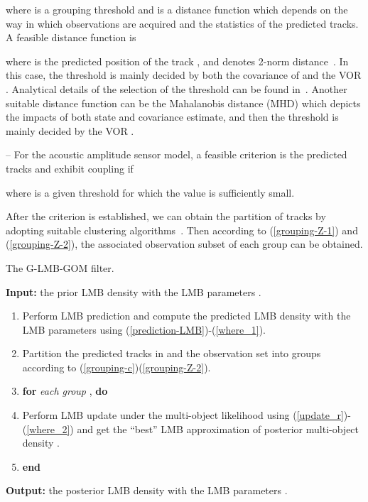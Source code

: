 \documentclass[journal]{IEEEtran}
\begin{document}
{where   is a grouping threshold and  is a distance function which depends on the way in which observations are acquired and the statistics of the predicted tracks.  A feasible  distance function is  

where  is the  predicted position of the track , and  denotes 2-norm distance~\cite{refr:tbd-2,refr:tbd-3, refr:tbd-4}. 
In this case, the threshold  is mainly decided by both the covariance of    and the VOR . Analytical details of the selection of the threshold can be found in~\cite{refr:tbd-3}. 
Another suitable distance function can be the Mahalanobis distance (MHD) which depicts the impacts of both state and covariance estimate, and then the threshold is mainly  decided by the VOR .
 
-- For the acoustic amplitude sensor model, a feasible    criterion is   the predicted tracks  and  exhibit coupling if

 where   is a given threshold for which the value  is sufficiently small. 


After the criterion is established, we can obtain the partition of tracks by adopting suitable clustering algorithms~\cite{refr:clustering_method}. 
Then according to (\ref{grouping-Z-1}) and (\ref{grouping-Z-2}), the associated observation subset of each group can be obtained.







\begin{algorithm}[t]\label{algorithm: generate lgmb}
\caption{The G-LMB-GOM filter.}
\begin{minipage}{0.93\columnwidth}
{\small
\textbf{Input: } the prior LMB density with the LMB parameters .  
\begin{enumerate} []
\item  
Perform LMB prediction  and
 compute the predicted LMB density 
with the LMB parameters 
  using (\ref{prediction-LMB})-(\ref{where_1}).
\item 
Partition the predicted tracks in  and the observation set  into  groups   according to (\ref{grouping-c})(\ref{grouping-Z-2}).
\item \textbf{for }\textit{each group} ,  \textbf{do}

\item Perform LMB update under the multi-object likelihood  using (\ref{update_r})-(\ref{where_2}) and get the ``best'' LMB  approximation of posterior multi-object density .
\item \textbf{end}
\end{enumerate} 
\textbf{Output:} the posterior LMB density with the LMB parameters .}
\end{minipage}
\end{algorithm}

}
\end{document}
